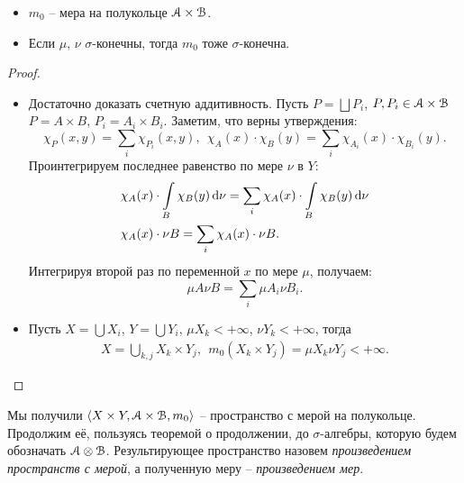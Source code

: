 \begin{theorem}
    \enewline
    \begin{itemize}
        \item $m_0$ -- мера на полукольце $\mathcal{A} \times \mathcal{B}$.
        \item Если $\mu$, $\nu$ $\sigma$-конечны, тогда $m_0$ тоже $\sigma$-конечна.
    \end{itemize} 
\end{theorem}
\begin{proof}
    \enewline
    \begin{itemize}
        \item Достаточно доказать счетную аддитивность. Пусть $P = \bigsqcup{P_i}$, $P, P_i \in \mathcal{A} \times \mathcal{B}$
            $P = A \times B$, $P_i = A_i \times B_i$. Заметим, что верны утверждения:
            \[
                \chi_P(x, y) = \sum_{i}{\chi_{P_i}(x, y)},~~
                \chi_A(x) \cdot \chi_B(y) = \sum_{i}{\chi_{A_i}(x) \cdot \chi_{B_i}(y)}
            .\]            
            Проинтегрируем последнее равенство по мере $\nu$ в $Y$:
            \begin{align*}
            &\chi_A(x) \cdot \int\limits_B{\chi_B(y) \,\mathrm{d}\nu} = \sum_{i}{\chi_A(x) \cdot \int\limits_B{\chi_B(y) \,\mathrm{d}\nu}} \\
            &\chi_A(x) \cdot \nu{B} = \sum_{i}{\chi_A(x) \cdot \nu{B}}
            .\end{align*}
            Интегрируя второй раз по переменной $x$ по мере $\mu$, получаем:
            \[
                \mu{A} \nu{B} = \sum_{i}{\mu{A_i} \nu{B_i}}
            .\]
        \item Пусть $X = \bigcup{X_i}$, $Y = \bigcup{Y_i}$, $\mu{X_k} < +\infty$, $\nu{Y_k} < +\infty$, 
            тогда 
            \begin{align*}
                X = \bigcup_{k, j}{X_k \times Y_j},~~ m_0(X_k \times Y_j) = \mu{X_k} \nu{Y_j} < +\infty
            .\end{align*}
    \end{itemize}
\end{proof}

\begin{definition}

    Мы получили $\langle X \times Y, \mathcal{A} \times \mathcal{B}, m_0 \rangle$ -- пространство с
    мерой на полукольце. Продолжим её, пользуясь теоремой о продолжении,
    до $\sigma$-алгебры, которую будем обозначать $\mathcal{A} \otimes \mathcal{B}$. Результирующее пространство
    назовем \textit{произведением пространств с мерой}, а полученную меру -- \textit{произведением мер}.
\end{definition}

